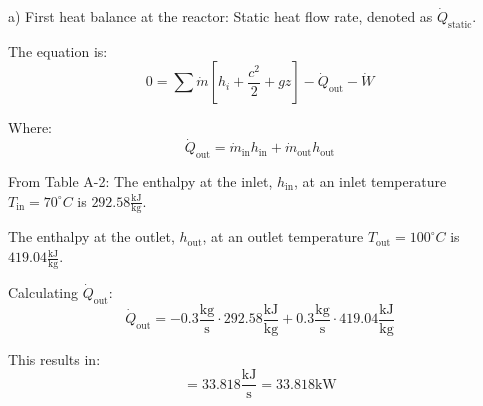a) First heat balance at the reactor:
Static heat flow rate, denoted as \( \dot{Q}_{\text{static}} \).

The equation is:
\[ 0 = \sum \dot{m} \left[ h_i + \frac{c^2}{2} + g z \right] - \dot{Q}_{\text{out}} - \dot{W} \]

Where:
\[ \dot{Q}_{\text{out}} = \dot{m}_{\text{in}} h_{\text{in}} + \dot{m}_{\text{out}} h_{\text{out}} \]

From Table A-2:
The enthalpy at the inlet, \( h_{\text{in}} \), at an inlet temperature \( T_{\text{in}} = 70^\circ C \) is \( 292.58 \frac{\text{kJ}}{\text{kg}} \).

The enthalpy at the outlet, \( h_{\text{out}} \), at an outlet temperature \( T_{\text{out}} = 100^\circ C \) is \( 419.04 \frac{\text{kJ}}{\text{kg}} \).

Calculating \( \dot{Q}_{\text{out}} \):
\[ \dot{Q}_{\text{out}} = -0.3 \frac{\text{kg}}{\text{s}} \cdot 292.58 \frac{\text{kJ}}{\text{kg}} + 0.3 \frac{\text{kg}}{\text{s}} \cdot 419.04 \frac{\text{kJ}}{\text{kg}} \]

This results in:
\[ = 33.818 \frac{\text{kJ}}{\text{s}} = 33.818 \text{kW} \]